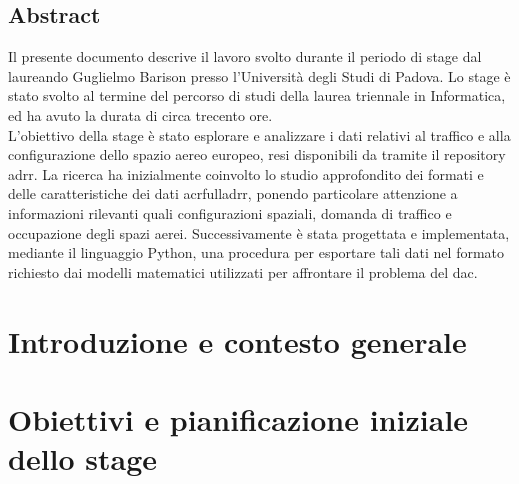 \documentclass[a4paper,11pt,twoside,texglossaries,palatino]{resources/thesis}
\begin{document}
    \startpreamble
    
        \cleardoublepage

        \section*{Abstract}      
        Il presente documento descrive il lavoro svolto durante il periodo di stage dal laureando Guglielmo Barison presso l'Università degli Studi di Padova. Lo stage è stato svolto al termine del percorso di studi della laurea triennale in Informatica, ed ha avuto la durata di circa trecento ore.\\
        L'obiettivo della stage è stato esplorare e analizzare i dati relativi al traffico e alla configurazione dello spazio aereo europeo, resi disponibili da \citet{eurocontrol2025} tramite il repository \acrfull{adrr}. La ricerca ha inizialmente coinvolto lo studio approfondito dei formati e delle caratteristiche dei dati acrfull{adrr}, ponendo particolare attenzione a informazioni rilevanti quali configurazioni spaziali, domanda di traffico e occupazione degli spazi aerei. 
        Successivamente è stata progettata e implementata, mediante il linguaggio Python, una procedura per esportare tali dati nel formato richiesto dai modelli matematici utilizzati per affrontare il problema del \acrfull{dac}. 
        \newpage
        
        \tableofcontents
        \listoffigures
     

    \stoppreamble

    \chapter{Introduzione e contesto generale}\label{ch:introduzione-contesto}
    
    \cleardoublepage
    \chapter{Obiettivi e pianificazione iniziale dello stage}
    \label{ch:obiettivi}
    
    \cleardoublepage
\end{document}
